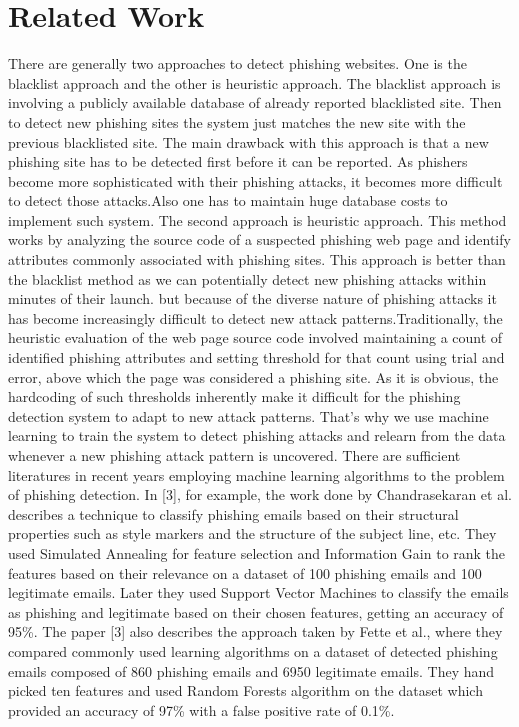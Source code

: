 \documentclass[conference]{IEEEtran}
\begin{document}
\section{Related Work}
\par There are generally two approaches to detect phishing websites. One is the blacklist approach and the other is heuristic approach. The blacklist approach is involving a publicly available database of already reported blacklisted site. Then to detect new phishing sites the system just matches the new site with the previous blacklisted site. The main drawback with this approach is that a new
phishing site has to be detected first before it can be reported.
As phishers become more sophisticated with their phishing
attacks, it becomes more difficult to detect those attacks.Also one has to maintain huge database costs to implement such system. The second approach is heuristic approach. This method works by analyzing the source
code of a suspected phishing web page and identify attributes
commonly associated with phishing sites. This approach is
better than the blacklist method as we can potentially detect
new phishing attacks within minutes of their launch. but because of the diverse nature of phishing attacks it has become increasingly difficult to detect new attack
patterns.Traditionally, the heuristic evaluation of the web page
source code involved maintaining a count of identified phishing
attributes and setting threshold for that count using trial and
error, above which the page was considered a phishing site.
As it is obvious, the hardcoding of such thresholds inherently
make it difficult for the phishing detection system to adapt
to new attack patterns. That's why we use machine learning to train
the system to detect phishing attacks and relearn from the data
whenever a new phishing attack pattern is uncovered. There
are sufficient literatures in recent years employing machine
learning algorithms to the problem of phishing detection. In
[3], for example, the work done by Chandrasekaran et al.
describes a technique to classify phishing emails based on their
structural properties such as style markers and the structure
of the subject line, etc. They used Simulated Annealing for
feature selection and Information Gain to rank the features
based on their relevance on a dataset of 100 phishing emails
and 100 legitimate emails. Later they used Support Vector
Machines to classify the emails as phishing and legitimate
based on their chosen features, getting an accuracy of 95\%.
The paper [3] also describes the approach taken by Fette et
al., where they compared commonly used learning algorithms
on a dataset of detected phishing emails composed of 860
phishing emails and 6950 legitimate emails. They hand picked
ten features and used Random Forests algorithm on the dataset
which provided an accuracy of 97\% with a false positive rate
of 0.1\%.
\end{document}
